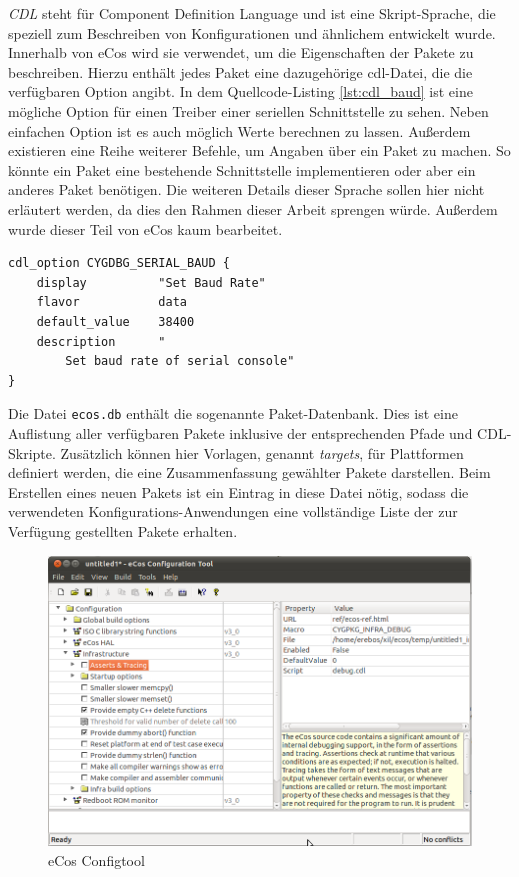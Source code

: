 \documentclass[
  a4paper,					%
  twoside,
  DIV=calc,     				%
  bibliography=totoc,
  cleardoublepage=empty,
  ngerman,     					%
  final       					%
]{scrbook}
\begin{document}
\emph{CDL} steht für Component Definition Language und ist eine Skript-Sprache, die speziell zum Beschreiben von Konfigurationen und ähnlichem entwickelt wurde. Innerhalb von eCos wird sie verwendet, um die Eigenschaften der Pakete zu beschreiben. Hierzu enthält jedes Paket eine dazugehörige cdl-Datei, die die verfügbaren Option angibt. In dem Quellcode-Listing \ref{lst:cdl_baud} ist eine mögliche Option für einen Treiber einer seriellen Schnittstelle zu sehen. Neben einfachen Option ist es auch möglich Werte berechnen zu lassen. Außerdem existieren eine Reihe weiterer Befehle, um Angaben über ein Paket zu machen. So könnte ein Paket eine bestehende Schnittstelle implementieren oder aber ein anderes Paket benötigen. Die weiteren Details dieser Sprache sollen hier nicht erläutert werden, da dies den Rahmen dieser Arbeit sprengen würde. Außerdem wurde dieser Teil von eCos kaum bearbeitet.

\begin{lstlisting}[frame=single, float, caption={CDL Option zum Setzen der Baud Rate}, label={lst:cdl_baud}]
cdl_option CYGDBG_SERIAL_BAUD {
	display          "Set Baud Rate"
	flavor           data
	default_value    38400
	description      "
	    Set baud rate of serial console"
}
\end{lstlisting}

Die Datei \texttt{ecos.db} enthält die sogenannte Paket-Datenbank. Dies ist eine Auflistung aller verfügbaren Pakete inklusive der entsprechenden Pfade und CDL-Skripte. Zusätzlich können hier Vorlagen, genannt \emph{targets}, für Plattformen definiert werden, die eine Zusammenfassung gewählter Pakete darstellen. Beim Erstellen eines neuen Pakets ist ein Eintrag in diese Datei nötig, sodass die verwendeten Konfigurations-Anwendungen eine vollständige Liste der zur Verfügung gestellten Pakete erhalten.

\begin{figure}
\centering
\includegraphics[width=12cm]{configtool}
\caption{eCos Configtool}
\label{fig:configtool}
\end{figure}
\end{document}
